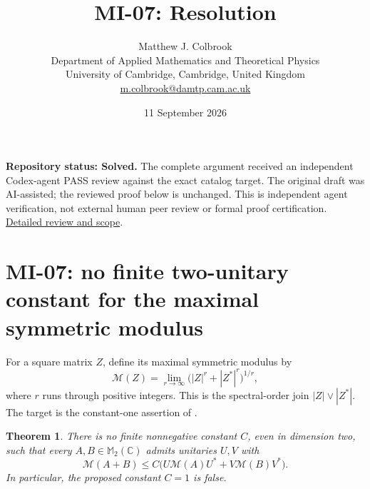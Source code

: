 \documentclass[10pt,a4paper]{article}
\title{MI-07: Resolution}
\author{Matthew J. Colbrook\\
\small Department of Applied Mathematics and Theoretical Physics\\
\small University of Cambridge, Cambridge, United Kingdom\\
\small\href{mailto:m.colbrook@damtp.cam.ac.uk}{m.colbrook@damtp.cam.ac.uk}}
\date{11 September 2026}
\newtheorem{theorem}{Theorem}[section]
\theoremstyle{remark}
\newcommand{\M}{\mathbb M}
\newcommand{\C}{\mathbb C}
\newcommand{\maxmod}{\mathcal M}
\begin{document}
\maketitle
\textbf{Repository status: Solved.}
The complete argument received an independent Codex-agent PASS review
against the exact catalog target.
The original draft was AI-assisted; the reviewed proof below is unchanged.
This is independent agent verification, not external human peer review or
formal proof certification. \href{https://github.com/ajt60gaibb/OpenProblemsInNLA/blob/main/references/colbrook-matrix-2026-09-11/verification/reviews/MI-07-review.md}{Detailed review and scope}.
\par\medskip
\section{MI-07: no finite two-unitary constant for the maximal symmetric modulus}
\label{sec:mi07}

For a square matrix $Z$, define its maximal symmetric modulus by
\[
 \maxmod(Z)=\lim_{r\to\infty}\bigl(|Z|^r+|Z^*|^r\bigr)^{1/r},
\]
where $r$ runs through positive integers. This is the spectral-order join $|Z|\vee|Z^*|$. The target is the constant-one assertion of \cite[Conjecture 3.12]{BL2026}.

\begin{theorem}\label{thm:mi07}
There is no finite nonnegative constant $C$, even in dimension two, such that every $A,B\in\M_2(\C)$ admits unitaries $U,V$ with
\begin{equation}\label{eq:mi07-target}
 \maxmod(A+B)\leq C\bigl(U\maxmod(A)U^*+V\maxmod(B)V^*\bigr).
\end{equation}
In particular, the proposed constant $C=1$ is false.
\end{theorem}
\end{document}
